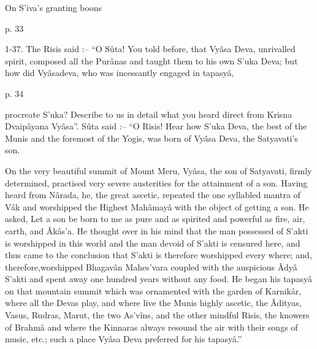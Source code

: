 On S’iva’s granting boons

 

p. 33

 

1-37. The Risis said :-- “O Sûta! You told before, that Vyâsa Deva, unrivalled spirit, composed all the Purânas and taught them to his own S’uka Deva; but how did Vyâsadeva, who was incessantly engaged in tapasyâ,

 

p. 34

 

procreate S’uka? Describe to us in detail what you heard direct from Krisna Dvaipâyana Vyâsa”. Sûta said :-- “O Risis! Hear how S’uka Deva, the best of the Munis and the foremost of the Yogis, was born of Vyâsa Deva, the Satyavati's son.

 

On the very beautiful summit of Mount Meru, Vyâsa, the son of Satyavati, firmly determined, practised very severe austerities for the attainment of a son. Having heard from Nârada, he, the great ascetic, repeated the one syllabled mantra of Vâk and worshipped the Highest Mahâmayâ with the object of getting a son. He asked, Let a son be born to me as pure and as spirited and powerful as fire, air, earth, and Âkâs’a. He thought over in his mind that the man possessed of S’akti is worshipped in this world and the man devoid of S’akti is censured here, and thus came to the conclusion that S’akti is therefore worshipped every where; and, therefore,worshipped Bhagavân Mahes'vara coupled with the auspicious Âdyâ S’akti and spent away one hundred years without any food. He began his tapasyâ on that mountain summit which was ornamented with the garden of Karnikâr, where all the Devas play, and where live the Munis highly ascetic, the Âdityas, Vasus, Rudras, Marut, the two As'vîns, and the other mindful Risis, the knowers of Brahmâ and where the Kinnaras always resound the air with their songs of music, etc.; such a place Vyâsa Deva preferred for his tapasyâ.”

 

